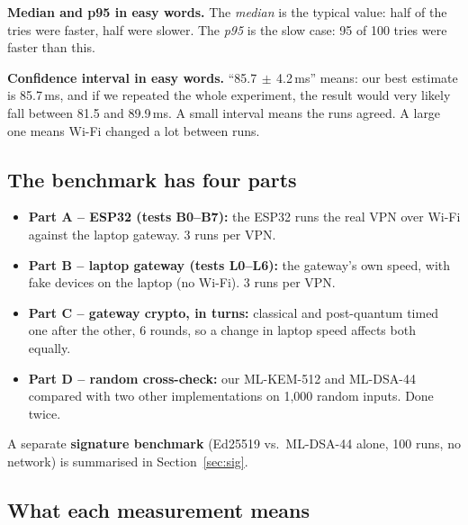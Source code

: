 \documentclass[10pt,a4paper]{article}
\newcommand{\PM}{\ensuremath{\,\pm\,}}
\begin{document}
\textbf{Median and p95 in easy words.} The \emph{median} is the typical value: half of the tries were
faster, half were slower. The \emph{p95} is the slow case: 95 of 100 tries were faster than this.

\textbf{Confidence interval in easy words.} ``85.7\PM4.2\,ms'' means: our best estimate is 85.7\,ms,
and if we repeated the whole experiment, the result would very likely fall between 81.5 and 89.9\,ms.
A small interval means the runs agreed. A large one means Wi-Fi changed a lot between runs.

\subsection*{The benchmark has four parts}

\begin{itemize}[nosep]
  \item \textbf{Part A -- ESP32 (tests B0--B7):} the ESP32 runs the real VPN over Wi-Fi against the laptop
        gateway. 3 runs per VPN.
  \item \textbf{Part B -- laptop gateway (tests L0--L6):} the gateway's own speed, with fake devices on
        the laptop (no Wi-Fi). 3 runs per VPN.
  \item \textbf{Part C -- gateway crypto, in turns:} classical and post-quantum timed one after the
        other, 6 rounds, so a change in laptop speed affects both equally.
  \item \textbf{Part D -- random cross-check:} our ML-KEM-512 and ML-DSA-44 compared with two other
        implementations on 1,000 random inputs. Done twice.
\end{itemize}

A separate \textbf{signature benchmark} (Ed25519 vs.\ ML-DSA-44 alone, 100 runs, no network) is
summarised in Section~\ref{sec:sig}.

\subsection*{What each measurement means}
\end{document}
